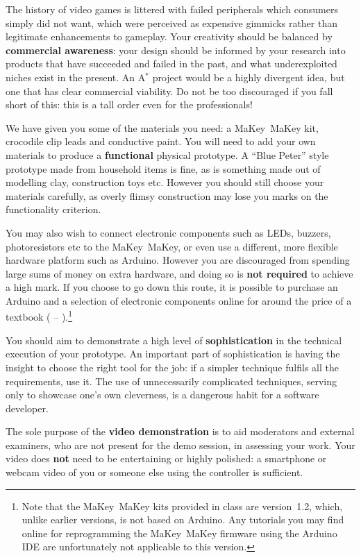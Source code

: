 \documentclass{../fal_assignment}
\begin{document}
The history of video games is littered with failed peripherals which consumers simply did not want,
which were perceived as expensive gimmicks rather than legitimate enhancements to gameplay.
Your creativity should be balanced by \textbf{commercial awareness}:
your design should be informed by your research into products that have succeeded and failed
in the past, and what underexploited niches exist in the present.
An A$^*$ project would be a highly divergent idea, but one that has clear commercial viability.
Do not be too discouraged if you fall short of this: this is a tall order even for the professionals!

We have given you some of the materials you need: a MaKey~MaKey kit, crocodile clip leads and conductive paint.
You will need to add your own materials to produce a \textbf{functional} physical prototype.
A ``Blue Peter'' style prototype made from household items is fine,
as is something made out of modelling clay, construction toys etc.
However you should still choose your materials carefully, as overly flimsy construction may
lose you marks on the functionality criterion.

You may also wish to connect electronic components such as LEDs, buzzers, photoresistors etc to the MaKey~MaKey,
or even use a different, more flexible hardware platform such as Arduino.
However you are discouraged from spending large sums of money on extra hardware,
and doing so is \textbf{not required} to achieve a high mark.
If you choose to go down this route,
it is possible to purchase an Arduino and a selection of electronic components online for 
around the price of a textbook ( -- ).\footnote{
    Note that the MaKey~MaKey kits provided in class are version~1.2, which, unlike earlier versions, is not based on Arduino.
    Any tutorials you may find online for reprogramming the MaKey~MaKey firmware using the Arduino IDE
    are unfortunately not applicable to this version.
}

You should aim to demonstrate a high level of \textbf{sophistication}
in the technical execution of your prototype.
An important part of sophistication is having the insight to choose the right tool for the job:
if a simpler technique fulfils all the requirements, use it.
The use of unnecessarily complicated techniques, serving only to showcase one's own cleverness,
is a dangerous habit for a software developer.

The sole purpose of the \textbf{video demonstration} is to aid moderators and external examiners,
who are not present for the demo session,
in assessing your work.
Your video does \textbf{not} need to be entertaining or highly polished:
a smartphone or webcam video of you or someone else using the controller is sufficient.
\end{document}
